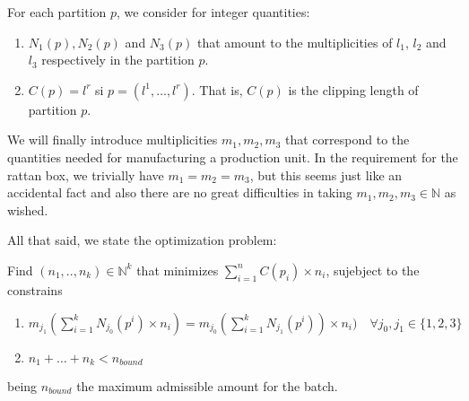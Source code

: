 \documentclass[12pt, letterpaper]{article}
\begin{document}
\vspace{10px}

For each partition $p$, we consider for integer quantities:
\begin{enumerate}
    \item $N_1(p), N_2(p)$ and $N_3(p)$ that amount to the multiplicities of $l_1$, $l_2$ and $l_3$ respectively in the partition $p$.
    \item $C(p) = l^r$ si $p = (l^1,\dots,l^r)$. That is, $C(p)$ is the clipping length of partition $p$.
\end{enumerate}
\vspace{10px}
We will finally introduce multiplicities $m_1, m_2, m_3$ that correspond to the quantities needed for manufacturing a production unit. In the requirement for the rattan box, we trivially have $m_1 = m_2 = m_3$, but this seems just like an accidental fact and also there are no great difficulties in taking $m_1, m_2, m_3 \in\mathbb{N}$ as wished.
\vspace{10px}
\par
All that said, we state the optimization problem:
\par
\vspace{10px}
Find $(n_1,..,n_k)\in\mathbb{N}^k$ that minimizes $\sum_{i=1}^n C(p_i)\times n_i$, sujebject to the constrains
\begin{enumerate}
    \item $m_{j_1}(\sum_{i=1}^k N_{j_0}(p^i)\times n_i) = m_{j_0}(\sum_{i=1}^k N_{j_1}(p^i))\times n_i)\quad\forall j_0, j_1\in \{1, 2, 3\}$
    \item $n_1 + \dots + n_k < n_{bound}$
\end{enumerate}
being $n_{bound}$ the maximum admissible amount for the batch. \\


\vspace{10px}
\par
\end{document}
